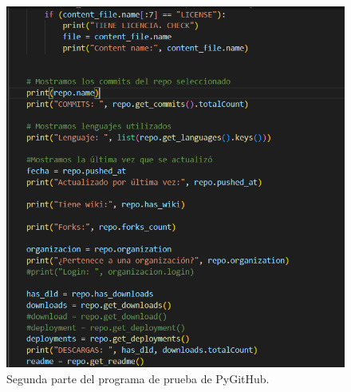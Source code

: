 \documentclass[a4paper, 12pt]{book}
\begin{document}
\begin{figure}
    \centering
    \includegraphics[width=1\textwidth, keepaspectratio]{img/pygithub_2.png}
    \caption{Segunda parte del programa de prueba de PyGitHub.}\label{fig:pygithub_2}
\end{figure}
  
\end{document}
